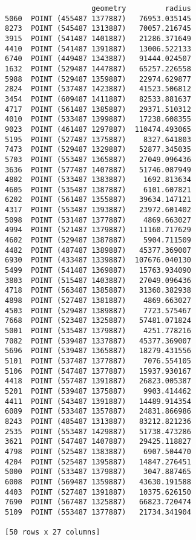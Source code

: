\documentclass[11pt]{article}
\begin{document}
\begin{verbatim}
                    geometry         radius  
5060  POINT (455487 1377887)   76953.035145  
8273  POINT (545487 1313887)   70057.216745  
3915  POINT (541487 1401887)   21286.371649  
4410  POINT (541487 1391887)   13006.522133  
6740  POINT (449487 1343887)   91444.024507  
1632  POINT (529487 1447887)   65257.226558  
5988  POINT (529487 1359887)   22974.629877  
2824  POINT (537487 1423887)   41523.506812  
3454  POINT (609487 1411887)   82533.881637  
4717  POINT (561487 1385887)   29371.510312  
4010  POINT (533487 1399887)   17238.608355  
9023  POINT (461487 1297887)  110474.493065  
5195  POINT (527487 1375887)    8327.641803  
7473  POINT (529487 1329887)   52877.345035  
5703  POINT (553487 1365887)   27049.096436  
3636  POINT (577487 1407887)   51746.087949  
4802  POINT (533487 1383887)    1692.813634  
4605  POINT (535487 1387887)    6101.607821  
6202  POINT (561487 1355887)   39634.147121  
4317  POINT (553487 1393887)   23972.601402  
5098  POINT (531487 1377887)    4869.663027  
4994  POINT (521487 1379887)   11160.717629  
4602  POINT (529487 1387887)    5904.711509  
4482  POINT (487487 1389887)   45377.369007  
6930  POINT (433487 1339887)  107676.040130  
5499  POINT (541487 1369887)   15763.934090  
3803  POINT (515487 1403887)   27049.096436  
4718  POINT (563487 1385887)   31360.382938  
4898  POINT (527487 1381887)    4869.663027  
4503  POINT (529487 1389887)    7723.575467  
7668  POINT (523487 1325887)   57481.071824  
5001  POINT (535487 1379887)    4251.778216  
7082  POINT (539487 1337887)   45377.369007  
5696  POINT (539487 1365887)   18279.431556  
5101  POINT (537487 1377887)    7076.554105  
5106  POINT (547487 1377887)   15937.930167  
4418  POINT (557487 1391887)   26823.005387  
5201  POINT (539487 1375887)    9903.414462  
4411  POINT (543487 1391887)   14489.914354  
6089  POINT (533487 1357887)   24831.866986  
8243  POINT (485487 1313887)   83212.821236  
2535  POINT (553487 1429887)   51738.473286  
3621  POINT (547487 1407887)   29425.118827  
4798  POINT (525487 1383887)    6907.504470  
4204  POINT (525487 1395887)   14847.276451  
5000  POINT (533487 1379887)    3047.887465  
6008  POINT (569487 1359887)   43630.191588  
4403  POINT (527487 1391887)   10375.626150  
7690  POINT (567487 1325887)   66823.720474  
5109  POINT (553487 1377887)   21734.341904  

[50 rows x 27 columns]
    \end{verbatim}
\end{document}
